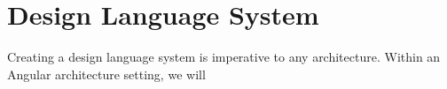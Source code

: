 \maketitle{}
\section{ Design Language System }

Creating a design language system is imperative to any architecture. Within an
Angular architecture setting, we will 
